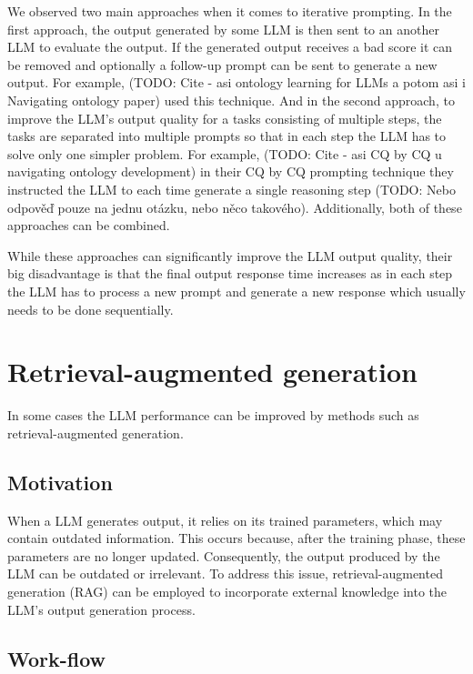 We observed two main approaches when it comes to iterative prompting. In the first approach, the output generated by some LLM is then sent to an another LLM to evaluate the output. If the generated output receives a bad score it can be removed and optionally a follow-up prompt can be sent to generate a new output. For example, (TODO: Cite - asi ontology learning for LLMs a potom asi i Navigating ontology paper) used this technique. And in the second approach, to improve the LLM's output quality for a tasks consisting of multiple steps, the tasks are separated into multiple prompts so that in each step the LLM has to solve only one simpler problem. For example, (TODO: Cite - asi CQ by CQ u navigating ontology development) in their CQ by CQ prompting technique they instructed the LLM to each time generate a single reasoning step (TODO: Nebo odpověď pouze na jednu otázku, nebo něco takového). Additionally, both of these approaches can be combined.

While these approaches can significantly improve the LLM output quality, their big disadvantage is that the final output response time increases as in each step the LLM has to process a new prompt and generate a new response which usually needs to be done sequentially.


\section{Retrieval-augmented generation}

In some cases the LLM performance can be improved by methods such as retrieval-augmented generation.

\subsection{Motivation}

When a LLM generates output, it relies on its trained parameters, which may contain outdated information. This occurs because, after the training phase, these parameters are no longer updated. Consequently, the output produced by the LLM can be outdated or irrelevant. To address this issue, retrieval-augmented generation (RAG) can be employed to incorporate external knowledge into the LLM's output generation process.


\subsection{Work-flow}

